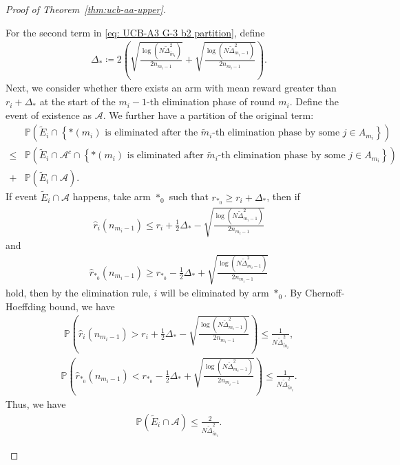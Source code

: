 \documentclass[
  12pt]{article}
\begin{document}
\begin{proof}[Proof of Theorem~\ref{thm:ucb-aa-upper}]
\begin{itemize}
For the second term in \eqref{eq: UCB-A3 G-3 b2 partition}, define
\begin{align*}
    \Delta_*\coloneqq2\left(\sqrt{\frac{\log(N\tilde{\Delta}_{\tilde{m}_i}^2)}{2n_{m_i-1}}}+\sqrt{\frac{\log(N\tilde{\Delta}_{m_i-1}^2)}{2n_{m_i-1}}}\right).
\end{align*}
Next, we consider whether there exists an arm with mean reward greater than $r_i+\Delta_*$ at the start of the $m_i-1$-th elimination phase of round $m_i$. Define the event of existence as $\mathcal{A}$. We further have a partition of the original term:
\begin{align*}
    &\mathbb{P}\left(\tilde{E}_i\cap\left\{\text{$*(m_i)$ is eliminated after the $\tilde{m}_i$-th elimination phase } \text{by some }j\in A_{m_i}\right\}\right)\\
\leq &\mathbb{P}\left(\tilde{E}_i\cap\mathcal{A}^c\cap\left\{\text{$*(m_i)$ is eliminated after $\tilde{m}_i$-th elimination phase } \text{by some }j\in A_{m_i}\right\}\right)\\
+& \mathbb{P}\left(\tilde{E}_i\cap\mathcal{A}\right).
\end{align*}
If event $\tilde{E}_i\cap\mathcal{A}$ happens, take arm $*_0$ such that $r_{*_0}\geq r_i+\Delta_*$, then if
\begin{align*}
    \hat{r}_i(n_{m_i-1}) \leq r_i +\frac{1}{2}\Delta_* -\sqrt{\frac{\log(N \tilde{\Delta}_{m_i-1}^2)}{2n_{m_i-1}}} 
\end{align*}
and  
\begin{align*}
    \hat{r}_{*_0}(n_{m_i-1}) \geq r_{*_0} -\frac{1}{2}\Delta_*+\sqrt{\frac{\log(N \tilde{\Delta}_{m_i-1}^2)}{2n_{m_i-1}}} 
\end{align*}
hold, then by the elimination rule, $i$ will be eliminated by arm $*_0$. By Chernoff-Hoeffding bound, we have
\begin{align*}
\mathbb{P}\left(\hat{r}_i(n_{m_i-1}) > r_i +\frac{1}{2}\Delta_* -\sqrt{\frac{\log(N \tilde{\Delta}_{m_i-1}^2)}{2n_{m_i-1}}}\right)\leq \frac{1}{N\tilde{\Delta}_{\tilde{m}_i}^2},
\end{align*}
\begin{align*}
\mathbb{P}\left(\hat{r}_{*_0}(n_{m_i-1}) < r_{*_0} -\frac{1}{2}\Delta_*+\sqrt{\frac{\log(N \tilde{\Delta}_{m_i-1}^2)}{2n_{m_i-1}}} \right)\leq \frac{1}{N\tilde{\Delta}_{\tilde{m}_i}^2}.
\end{align*}
Thus, we have
\begin{align*}
    \mathbb{P}\left(\tilde{E}_i\cap\mathcal{A}\right)\leq \frac{2}{N\tilde{\Delta}_{\tilde{m}_i}^2}.
\end{align*}


\end{itemize}
\end{proof}
\end{document}
